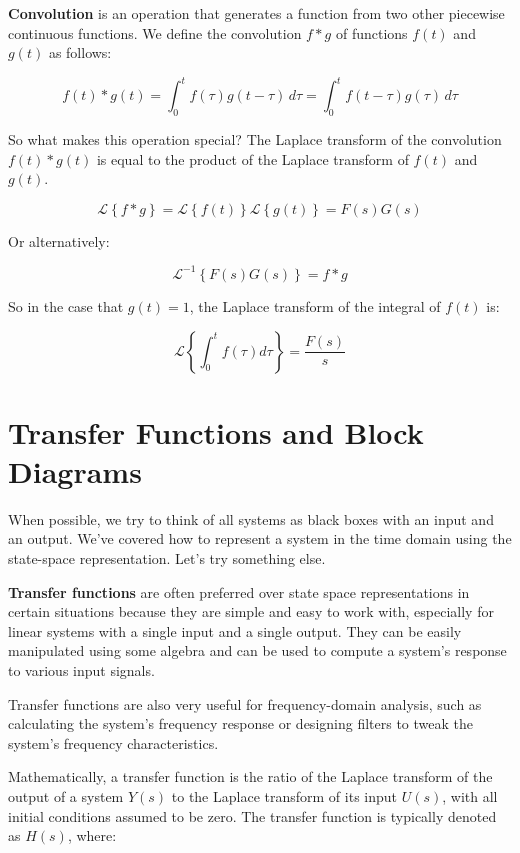 \documentclass[
  letterpaper,
  DIV=11,
  numbers=noendperiod]{scrreprt}
\begin{document}
\textbf{Convolution} is an operation that generates a function from two
other piecewise continuous functions. We define the convolution
\(f \ast g\) of functions \(f(t)\) and \(g(t)\) as follows:

\[f(t) \ast g(t) = \int_0^t f(\tau) g(t-\tau) \, d\tau = \int_0^t f(t-\tau) g(\tau) \, d\tau\]

So what makes this operation special? The Laplace transform of the
convolution \(f(t) \ast g(t)\) is equal to the product of the Laplace
transform of \(f(t)\) and \(g(t)\).

\[\mathcal{L} \left\{f\ast g \right\} = \mathcal{L} \left\{f(t) \right\} \mathcal{L} \left\{g(t) \right\} = F(s) G(s)\]

Or alternatively:

\[\mathcal{L}^{-1} \left\{F(s) G(s) \right\} = f \ast g\]

So in the case that \(g(t) = 1\), the Laplace transform of the integral
of \(f(t)\) is:

\[\mathcal{L} \left\{\int_0^t f(\tau) d\tau \right\} = \frac{F(s)}{s}\]

\hypertarget{transfer-functions-and-block-diagrams}{%
\section{Transfer Functions and Block
Diagrams}\label{transfer-functions-and-block-diagrams}}

When possible, we try to think of all systems as black boxes with an
input and an output. We've covered how to represent a system in the time
domain using the state-space representation. Let's try something else.

\textbf{Transfer functions} are often preferred over state space
representations in certain situations because they are simple and easy
to work with, especially for linear systems with a single input and a
single output. They can be easily manipulated using some algebra and can
be used to compute a system's response to various input signals.

Transfer functions are also very useful for frequency-domain analysis,
such as calculating the system's frequency response or designing filters
to tweak the system's frequency characteristics.

Mathematically, a transfer function is the ratio of the Laplace
transform of the output of a system \(Y(s)\) to the Laplace transform of
its input \(U(s)\), with all initial conditions assumed to be zero. The
transfer function is typically denoted as \(H(s)\), where:
\end{document}
